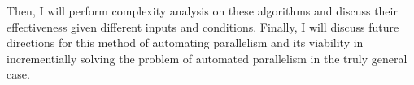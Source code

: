 Then, I will perform complexity analysis on these algorithms and discuss
their effectiveness given different inputs and conditions. Finally, I will
discuss future directions for this method of automating parallelism and its
viability in incrementially solving the problem of automated parallelism in the
truly general case.

